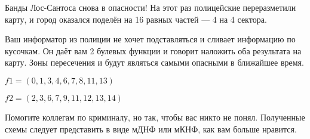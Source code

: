\question
Банды Лос-Сантоса снова в опасности! На этот раз полицейские переразметили карту, и город оказался поделён на 16 равных частей — 4 на 4 сектора.

Ваш информатор из полиции не хочет подставляться и сливает информацию по кусочкам. Он даёт вам 2 булевых функции и говорит наложить оба результата на карту. Зоны пересечения и будут являться самыми опасными в ближайшее время.

\begin{center}
$f1=(0,1,3,4,6,7,8,11,13)$

$f2=(2,3,6,7,9,11,12,13,14)$
\end{center}

Помогите коллегам по криминалу, но так, чтобы вас никто не понял. Полученные схемы следует представить в виде мДНФ или мКНФ, как вам больше нравится.